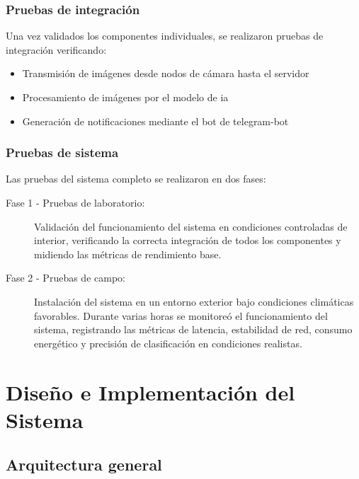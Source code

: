 \documentclass[a4paper, 12pt]{report}
\begin{document}
\subsection{Pruebas de integración}

Una vez validados los componentes individuales, se realizaron pruebas de
integración verificando:

\begin{itemize}
  \item Transmisión de imágenes desde nodos de cámara hasta el servidor
  \item Procesamiento de imágenes por el modelo de \gls{ia}
  \item Generación de notificaciones mediante el bot de \gls{telegram-bot}
\end{itemize}

\subsection{Pruebas de sistema}

Las pruebas del sistema completo se realizaron en dos fases:

\begin{description}
  \item[Fase 1 - Pruebas de laboratorio:] Validación del funcionamiento del
    sistema en condiciones controladas de interior, verificando la
    correcta integración de todos los componentes y midiendo las métricas
    de rendimiento base.
  \item[Fase 2 - Pruebas de campo:] Instalación del sistema en un entorno
    exterior bajo condiciones climáticas favorables. Durante varias horas
    se monitoreó el funcionamiento del sistema, registrando las métricas
    de latencia, estabilidad de red, consumo energético y precisión de
    clasificación en condiciones realistas.
\end{description}

\chapter{Diseño e Implementación del Sistema}

\section{Arquitectura general}
\end{document}
